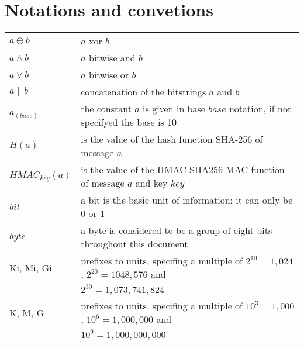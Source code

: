 \section{Notations and convetions}
\begin{tabular}{ll}
$a \oplus b$ & $a$ xor $b$ \\
$a \wedge b$ & $a$ bitwise and $b$ \\
$a \vee b$ & $a$ bitwise or $b$ \\
$a \parallel b$ & concatenation of the bitstrings $a$ and $b$ \\
$a_{(base)}$ & the constant $a$ is given in base $base$ notation, if not specifyed the base is 10\\
$H(a)$ & is the value of the hash function SHA-256 of message $a$ \\
$HMAC_{key}(a)$ & is the value of the HMAC-SHA256 MAC function of message $a$ and key $key$ \\
$bit$ & a bit is the basic unit of information; it can only be 0 or 1 \\
$byte$ & a byte is considered to be a group of eight bits throughout this document \\
Ki, Mi, Gi & prefixes to units, specifing a multiple of $2^{10} = 1,024$, $2^{20} = 1048,576$ and\\ & $2^{30} = 1,073,741,824$ \\
K, M, G & prefixes to units, specifing a multiple of $10^3 = 1,000$, $10^6 = 1,000,000$ and\\ & $10^9=1,000,000,000$ \\ 
\end{tabular}